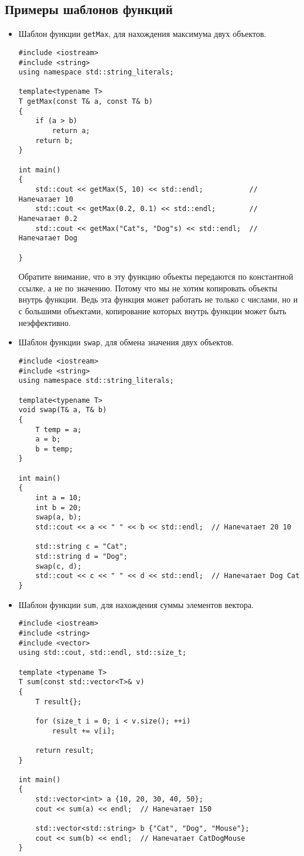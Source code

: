 \documentclass{article}
\begin{document}
\subsection*{Примеры шаблонов функций}
\begin{itemize}
\item Шаблон функции \texttt{getMax}, для нахождения максимума двух объектов.
\begin{lstlisting}
#include <iostream>
#include <string>
using namespace std::string_literals;

template<typename T>
T getMax(const T& a, const T& b) 
{
    if (a > b)
        return a;
    return b;
}

int main() 
{
    std::cout << getMax(5, 10) << std::endl;           // Напечатает 10
    std::cout << getMax(0.2, 0.1) << std::endl;        // Напечатает 0.2
    std::cout << getMax("Cat"s, "Dog"s) << std::endl;  // Напечатает Dog
   
}
\end{lstlisting}
Обратите внимание, что в эту функцию объекты передаются по константной ссылке, а не по значению. Потому что мы не хотим копировать объекты внутрь функции. Ведь эта функция может работать не только с числами, но и с большими объектами, копирование которых внутрь функции может быть неэффективно.

\newpage
\item Шаблон функции \texttt{swap}, для обмена значения двух объектов.
\begin{lstlisting}
#include <iostream>
#include <string>
using namespace std::string_literals;

template<typename T>
void swap(T& a, T& b) 
{
    T temp = a;
    a = b;
    b = temp;
}

int main() 
{
	int a = 10;
	int b = 20;
	swap(a, b);
	std::cout << a << " " << b << std::endl;  // Напечатает 20 10
	
	std::string c = "Cat";
	std::string d = "Dog";
	swap(c, d);
	std::cout << c << " " << d << std::endl;  // Напечатает Dog Cat	
}
\end{lstlisting}


\item Шаблон функции \texttt{sum}, для нахождения суммы элементов вектора.
\begin{lstlisting}
#include <iostream>
#include <string>
#include <vector>
using std::cout, std::endl, std::size_t;

template <typename T>
T sum(const std::vector<T>& v)
{
    T result{};

    for (size_t i = 0; i < v.size(); ++i)
        result += v[i];

    return result;
}

int main() 
{
    std::vector<int> a {10, 20, 30, 40, 50};
    cout << sum(a) << endl;  // Напечатает 150

    std::vector<std::string> b {"Cat", "Dog", "Mouse"};
    cout << sum(b) << endl;  // Напечатает CatDogMouse
}
\end{lstlisting}

\end{itemize}
\end{document}
